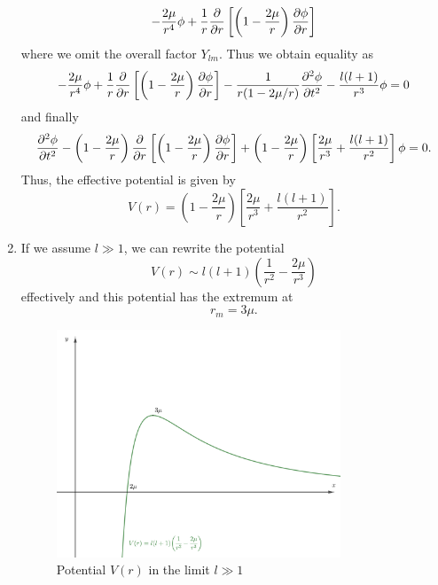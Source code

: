 \documentclass[a4paper,pdftex,10pt]{article}
\begin{document}
\begin{enumerate}
\begin{align}
          -
          \frac{2\mu}{r^4}\phi
          +
          \frac{1}{r}\pdv{}{r}\left[ \left( 1-\frac{2\mu}{r} \right)\pdv{\phi}{r} \right]
        \end{align}
        where we omit the overall factor $Y_{lm}$. Thus we obtain equality as
        \begin{equation}
          -
          \frac{2\mu}{r^4}\phi
          +
          \frac{1}{r}\pdv{}{r}\left[ \left( 1-\frac{2\mu}{r} \right)\pdv{\phi}{r} \right]
          -
          \frac{1}{r(1-2\mu/r)}\pdv[2]{\phi}{t}
          -
          \frac{l(l+1)}{r^3}\phi
          =
          0
        \end{equation}
        and finally
        \begin{equation}
          \pdv[2]{\phi}{t}
          -
          \left( 1-\frac{2\mu}{r} \right)\pdv{}{r}\left[ \left( 1-\frac{2\mu}{r} \right)\pdv{\phi}{r} \right]
          +
          \left( 1-\frac{2\mu}{r} \right)
          \left[ \frac{2\mu}{r^3}+\frac{l(l+1)}{r^2} \right]\phi
          =
          0
          .
        \end{equation}
        Thus, the effective potential is given by
        \begin{equation}
          V(r)
          =
          \left( 1-\frac{2\mu}{r} \right)
          \left[ \frac{2\mu}{r^3}+\frac{l(l+1)}{r^2} \right]
          .
        \end{equation}

  \item
  If we assume $l\gg 1$, we can rewrite the potential
  \begin{equation}
    V(r)
    \sim
    l(l+1)\left( \frac{1}{r^2}-\frac{2\mu}{r^3} \right)
  \end{equation}
  effectively and this potential has the extremum at 
  \begin{equation}
    r_{m}
    =
    3\mu
    .
  \end{equation}

  \begin{figure}[ht]
    \centering
    \includegraphics[width=0.8\textwidth]{potential.PNG}
    \caption{Potential $V(r)$ in the limit $l\gg 1$}
  \end{figure}


\end{enumerate}
\end{document}
